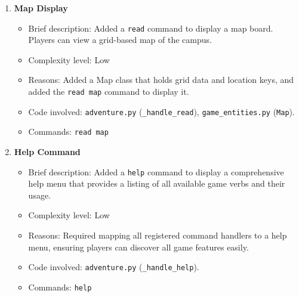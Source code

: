 \documentclass[11pt]{article}
\begin{document}
\begin{enumerate}
    \item \textbf{Map Display}
    \begin{itemize}
        \item Brief description: Added a \texttt{read} command to display a map board. Players can view a grid-based map of the campus.
        \item Complexity level: Low
        \item Reasons: Added a Map class that holds grid data and location keys, and added the \texttt{read map} command to display it.
        \item Code involved: \texttt{adventure.py} (\texttt{_handle_read}), \texttt{game_entities.py} (\texttt{Map}).
        \item Commands: \texttt{read map}
    \end{itemize}

    \item \textbf{Help Command}
    \begin{itemize}
        \item Brief description: Added a \texttt{help} command to display a comprehensive help menu that provides a listing of all available game verbs and their usage.
        \item Complexity level: Low
        \item Reasons: Required mapping all registered command handlers to a help menu, ensuring players can discover all game features easily.
        \item Code involved: \texttt{adventure.py} (\texttt{_handle_help}).
        \item Commands: \texttt{help}
    \end{itemize}
\end{enumerate}
\end{document}
